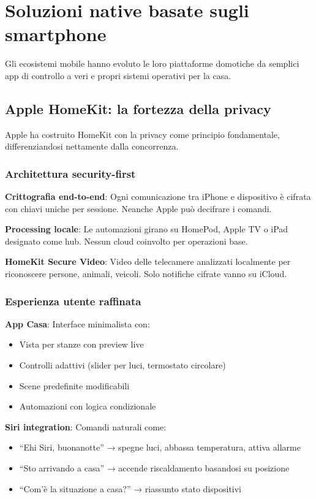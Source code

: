 \section{Soluzioni native basate sugli smartphone}

Gli ecosistemi mobile hanno evoluto le loro piattaforme domotiche da semplici app di controllo a veri e propri sistemi operativi per la casa.

\subsection{Apple HomeKit: la fortezza della privacy}

Apple ha costruito HomeKit con la privacy come principio fondamentale, differenziandosi nettamente dalla concorrenza.

\subsubsection{Architettura security-first}

\textbf{Crittografia end-to-end}: Ogni comunicazione tra iPhone e dispositivo è cifrata con chiavi uniche per sessione. Neanche Apple può decifrare i comandi.

\textbf{Processing locale}: Le automazioni girano su HomePod, Apple TV o iPad designato come hub. Nessun cloud coinvolto per operazioni base.

\textbf{HomeKit Secure Video}: Video delle telecamere analizzati localmente per riconoscere persone, animali, veicoli. Solo notifiche cifrate vanno su iCloud.

\subsubsection{Esperienza utente raffinata}

\textbf{App Casa}: Interface minimalista con:
\begin{itemize}
    \item Vista per stanze con preview live
    \item Controlli adattivi (slider per luci, termostato circolare)
    \item Scene predefinite modificabili
    \item Automazioni con logica condizionale
\end{itemize}

\textbf{Siri integration}: Comandi naturali come:
\begin{itemize}
    \item ``Ehi Siri, buonanotte'' → spegne luci, abbassa temperatura, attiva allarme
    \item ``Sto arrivando a casa'' → accende riscaldamento basandosi su posizione
    \item ``Com'è la situazione a casa?'' → riassunto stato dispositivi
\end{itemize}

